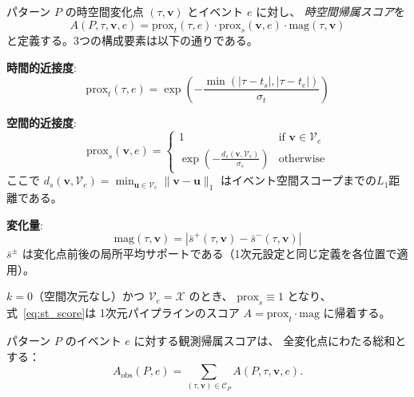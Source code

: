 \begin{definition}[時空間帰属スコア]\label{def:st_score}
パターン $P$ の時空間変化点 $(\tau, \mathbf{v})$ とイベント $e$ に対し、
\emph{時空間帰属スコア}を
\begin{equation}\label{eq:st_score}
A(P, \tau, \mathbf{v}, e) = \mathrm{prox}_t(\tau, e) \cdot \mathrm{prox}_s(\mathbf{v}, e) \cdot \mathrm{mag}(\tau, \mathbf{v})
\end{equation}
と定義する。3つの構成要素は以下の通りである。

\textbf{時間的近接度}:
\begin{equation}\label{eq:prox_t}
\mathrm{prox}_t(\tau, e) = \exp\!\left(-\frac{\min(|\tau - t_s|, |\tau - t_e|)}{\sigma_t}\right)
\end{equation}

\textbf{空間的近接度}:
\begin{equation}\label{eq:prox_s}
\mathrm{prox}_s(\mathbf{v}, e) = \begin{cases}
1 & \text{if } \mathbf{v} \in \mathcal{V}_e \\
\exp\!\left(-\frac{d_s(\mathbf{v}, \mathcal{V}_e)}{\sigma_s}\right) & \text{otherwise}
\end{cases}
\end{equation}
ここで $d_s(\mathbf{v}, \mathcal{V}_e) = \min_{\mathbf{u} \in \mathcal{V}_e} \|\mathbf{v} - \mathbf{u}\|_1$ はイベント空間スコープまでの$L_1$距離である。

\textbf{変化量}:
\begin{equation}\label{eq:st_mag}
\mathrm{mag}(\tau, \mathbf{v}) = |\bar{s}^{+}(\tau, \mathbf{v}) - \bar{s}^{-}(\tau, \mathbf{v})|
\end{equation}
$\bar{s}^{\pm}$ は変化点前後の局所平均サポートである（1次元設定と同じ定義を各位置で適用）。
\end{definition}

\begin{remark}[1次元設定への帰着]
$k = 0$（空間次元なし）かつ $\mathcal{V}_e = \mathcal{X}$ のとき、
$\mathrm{prox}_s \equiv 1$ となり、式~\eqref{eq:st_score}は
1次元パイプラインのスコア $A = \mathrm{prox}_t \cdot \mathrm{mag}$ に帰着する。
\end{remark}

パターン $P$ のイベント $e$ に対する観測帰属スコアは、
全変化点にわたる総和とする：
\begin{equation}\label{eq:obs_score}
A_{\mathrm{obs}}(P, e) = \sum_{(\tau, \mathbf{v}) \in \mathcal{C}_P} A(P, \tau, \mathbf{v}, e).
\end{equation}

